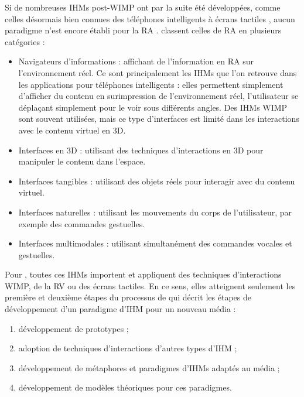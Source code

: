 Si de nombreuses IHMs post-WIMP ont par la suite été développées, comme celles désormais bien connues des téléphones intelligents à écrans tactiles \citep{Jacob2008}, aucun paradigme n'est encore établi pour la RA \citep{VanKrevelen2010}. \cite{Billinghurst2015} classent celles de RA en plusieurs catégories :
\begin{itemize}
  \item Navigateurs d'informations : affichant de l'information en RA sur l'environnement réel. Ce sont principalement les IHMs que l'on retrouve dans les applications pour téléphones intelligents  : elles permettent simplement d'afficher du contenu en surimpression de l'environnement réel, l'utilisateur se déplaçant simplement pour le voir sous différents angles. Des IHMs WIMP sont souvent utilisées, mais ce type d'interfaces est limité dans les interactions avec le contenu virtuel en 3D.
  \item Interfaces en 3D : utilisant des techniques d'interactions en 3D pour manipuler le contenu dans l'espace.
  \item Interfaces tangibles : utilisant des objets réels pour interagir avec du contenu virtuel.
  \item Interfaces naturelles : utilisant les mouvements du corps de l'utilisateur, par exemple des commandes gestuelles.
  \item Interfaces multimodales : utilisant simultanément des commandes vocales et gestuelles.
\end{itemize}
\medskip

Pour \cite{Billinghurst2015}, toutes ces IHMs importent et appliquent des techniques d'interactions WIMP, de la RV ou des écrans tactiles. En ce sens, elles atteignent seulement les première et deuxième étapes du processus de \cite{Billinghurst2005} qui décrit les étapes de développement d'un paradigme d'IHM pour un nouveau média :
\begin{enumerate}
  \item développement de prototypes ;
  \item adoption de techniques d'interactions d'autres types d'IHM ;
  \item développement de métaphores et paradigmes d'IHMs adaptés au média ;
  \item développement de modèles théoriques pour ces paradigmes.
\end{enumerate}
\medskip

